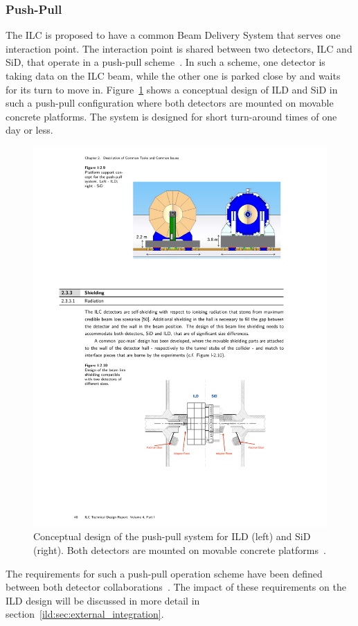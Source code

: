 \subsubsection{Push-Pull}
The ILC is proposed to have a common Beam Delivery System that serves one interaction point. The interaction point is shared between two detectors, ILC and SiD, that operate in a push-pull scheme~\cite{Behnke:2013xla}. In such a scheme, one detector is taking data on the ILC beam, while the other one is parked close by and waits for its turn to move in. Figure~\ref{ild:fig:push_pull} shows a conceptual design of ILD and SiD in such a push-pull configuration where both detectors are mounted on movable concrete platforms. The system is designed for short turn-around times of one day or less.
\begin{figure}[h!]
\centering
\includegraphics[width=0.8\hsize]{ILC/figs/push-pull.pdf}
\caption{\label{ild:fig:push_pull}Conceptual design of the push-pull system for ILD (left) and SiD (right). Both detectors are mounted on movable concrete platforms~\cite{Behnke:2013xla}.}
\end{figure}
The requirements for such a push-pull operation scheme have been defined between both detector collaborations~\cite{Parker:2009zz}. The impact of these requirements on the ILD design will be discussed in more detail in section~\ref{ild:sec:external_integration}.

